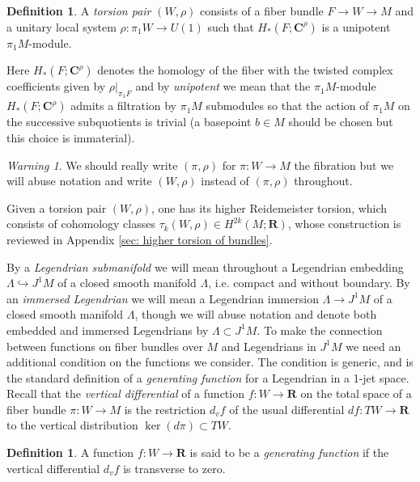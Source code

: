 \documentclass{amsart}
\def\bC{\mathbf{C}}
\def\bR{\mathbf{R}}
\theoremstyle{definition}
\newtheorem{definition}[theorem]{Definition}
\theoremstyle{remark}
\newtheorem{inductive lemma}[theorem]{Inductive Lemma}
\newtheorem{warning}[theorem]{Warning}
\begin{document}
 \begin{definition}
 A {\em torsion pair} $(W,\rho)$ consists of a fiber bundle $F \to W \to M$ and a unitary local system  $\rho : \pi_1 W \to U(1)$ such that $H_*(F;\bC^\rho)$ is a unipotent $\pi_1M$-module.
 \end{definition}
 
Here $H_*(F;\bC^\rho)$ denotes the homology of the fiber with the twisted complex coefficients given by $\rho|_{\pi_1F}$ and by {\em unipotent} we mean that the $\pi_1M$-module $H_*(F;\bC^\rho)$ admits a filtration by $\pi_1M$ submodules so that the action of $\pi_1M$ on the successive subquotients is trivial (a basepoint $b \in M$ should be chosen but this choice is immaterial). 
 
 \begin{warning}
We should really write $(\pi,\rho)$ for $\pi:W \to M$ the fibration but we will abuse notation and write $(W, \rho)$ instead of $(\pi, \rho)$ throughout. 
 \end{warning}
 
 Given a torsion pair $(W,\rho)$, one has its higher Reidemeister torsion, which consists of cohomology classes $\tau_k(W,\rho) \in H^{2k}(M;\bR)$, whose construction is reviewed in Appendix \ref{sec: higher torsion of bundles}. 
 
 By a {\em Legendrian submanifold} we will mean throughout a Legendrian embedding $\Lambda \hookrightarrow J^1M$ of a closed smooth manifold $\Lambda$, i.e. compact and without boundary. By an {\em immersed Legendrian} we will mean a Legendrian immersion $\Lambda \to J^1M$ of a closed smooth manifold $\Lambda$, though we will abuse notation and denote both embedded and immersed Legendrians by $\Lambda \subset J^1 M$. To make the connection between functions on fiber bundles over $M$ and Legendrians in $J^1M$ we need an additional condition on the functions we consider. The condition is generic, and is the standard definition of a {\em generating function} for a Legendrian in a 1-jet space. Recall that the {\em vertical differential} of a function $f:W \to \bR$ on the total space of a fiber bundle $\pi: W \to M$ is the restriction $d_vf$ of the usual differential $df:TW \to \bR$ to the vertical distribution $\ker(d \pi) \subset TW$. 

\begin{definition} A function $f:W \to \bR$ is said to be a {\em{generating function}} if the vertical differential $d_v f$ is transverse to zero. 
\end{definition}
\end{document}
